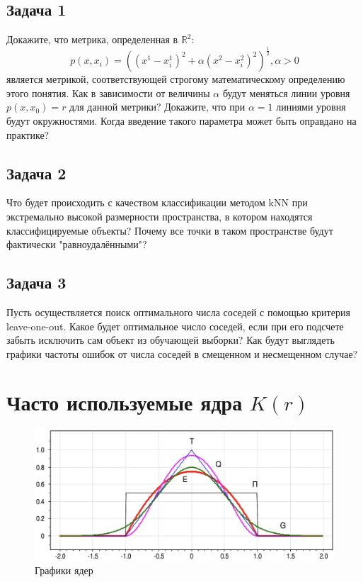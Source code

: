 \subsection{Задача 1}
Докажите, что метрика, определенная в $\mathbb{R}^2$:
\begin{equation}
    p(x, x_i) = \left( (x^1 - x^1_i)^2 + \alpha (x^2 - x^2_i)^2 \right)^\frac{1}{2}, \alpha > 0 
\end{equation}
является метрикой, соответствующей строгому математическому определению этого понятия.
Как в зависимости от величины $\alpha$ будут меняться линии уровня $p(x, x_0) = r$ для данной метрики? 
Докажите, что при $\alpha = 1$ линиями уровня будут окружностями.
Когда введение такого параметра может быть оправдано на практике?

\subsection{Задача 2}
Что будет происходить с качеством классификации методом kNN при экстремально высокой размерности пространства, в котором находятся классифицируемые объекты? Почему все точки в таком пространстве будут фактически "равноудалёнными"?

\subsection{Задача 3}
Пусть осуществляется поиск оптимального числа соседей с помощью критерия leave-one-out. Какое будет оптимальное число соседей, если при его подсчете забыть исключить сам объект из обучающей выборки? Как будут выглядеть графики частоты ошибок от числа соседей в смещенном и несмещенном случае? 

\section*{Часто используемые ядра \(K(r)\)}

\begin{figure}[ht]
    \centering
    \includegraphics[width=\textwidth]{chapters/metric/images/I1.png}
    \caption{Графики ядер}
    \label{fig:kernels}
\end{figure}

